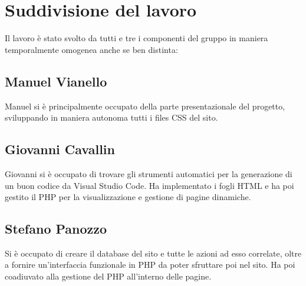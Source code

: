 \newpage
\section{Suddivisione del lavoro}
Il lavoro è stato svolto da tutti e tre i componenti del gruppo in maniera temporalmente omogenea anche se ben distinta:
\subsection{Manuel Vianello}
Manuel si è principalmente occupato della parte presentazionale del progetto, sviluppando in maniera autonoma tutti i files CSS del sito.
\subsection{Giovanni Cavallin}
Giovanni si è occupato di trovare gli strumenti automatici per la generazione di un buon codice da Visual Studio Code. Ha implementato i fogli HTML e ha poi gestito il PHP per la visualizzazione e gestione di pagine dinamiche.
\subsection{Stefano Panozzo}
Si è occupato di creare il database del sito e tutte le azioni ad esso correlate, oltre a fornire un'interfaccia funzionale in PHP da poter sfruttare poi nel sito. Ha poi coadiuvato alla gestione del PHP all'interno delle pagine.